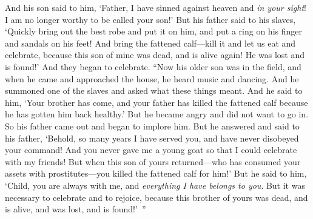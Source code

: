 \begin{biblechapter}
\verse And his son said to him, ‘Father, I have sinned against heaven and \textit{in your sight}! I am no longer worthy to be called your son!’
\verse But his father said to his slaves, ‘Quickly bring out the best robe and put it on him, and put a ring on his finger and sandals on his feet!
\verse And bring the fattened calf—kill it and let us eat and celebrate,
\verse because this son of mine was dead, and is alive again! He was lost and is found!’ And they began to celebrate.
\verse “Now his older son was in the field, and when he came and approached the house, he heard music and dancing.
\verse And he summoned one of the slaves and asked what these things meant.
\verse And he said to him, ‘Your brother has come, and your father has killed the fattened calf because he has gotten him back healthy.’
\verse But he became angry and did not want to go in. So his father came out and began to implore him.
\verse But he answered and said to his father, ‘Behold, so many years I have served you, and have never disobeyed your command! And you never gave me a young goat so that I could celebrate with my friends!
\verse But when this son of yours returned—who has consumed your assets with prostitutes—you killed the fattened calf for him!’
\verse But he said to him, ‘Child, you are always with me, and \textit{everything I have belongs to you}.
\verse But it was necessary to celebrate and to rejoice, because this brother of yours was dead, and is alive, and was lost, and is found!’ ”
\end{biblechapter}

